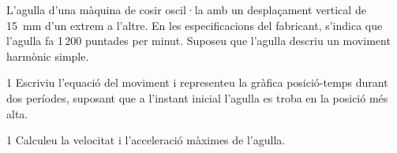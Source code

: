 L'agulla d'una màquina de cosir oscil·la amb un desplaçament vertical de 15~mm d'un extrem a l'altre. En les especificacions del fabricant, s'indica que l'agulla fa 1\,200 puntades per minut. Suposeu que l'agulla descriu un moviment harmònic simple.

\begin{apartat}{1}
Escriviu l'equació del moviment i representeu la gràfica posició-temps durant dos períodes, suposant que a l'instant inicial l'agulla es troba en la posició més alta.
\end{apartat}

\begin{apartat}{1}
Calculeu la velocitat i l'acceleració màximes de l'agulla.
\end{apartat}
